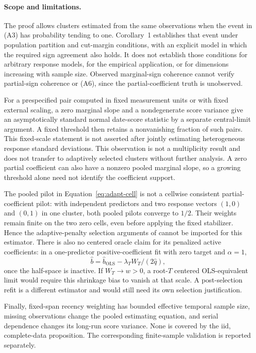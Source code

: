 \documentclass[11pt,a4paper]{article}
\begin{document}
\paragraph{Scope and limitations.}
The proof allows clusters estimated from the same observations when the event
in (A3) has probability tending to one. Corollary~1 establishes that event
under population partition and cut-margin conditions, with an explicit model
in which the required sign agreement also holds. It does not establish those
conditions for arbitrary response models, for the empirical application, or
for dimensions increasing with sample size. Observed marginal-sign coherence
cannot verify partial-sign coherence or (A6), since the partial-coefficient
truth is unobserved.

For a prespecified pair computed in fixed measurement units or with fixed
external scaling, a zero marginal slope and a nondegenerate score variance
give an asymptotically standard normal date-score statistic by a separate
central-limit argument. A fixed threshold then retains a nonvanishing
fraction of such pairs. This fixed-scale statement is not asserted after
jointly estimating heterogeneous response standard deviations.
This observation is not a multiplicity result and
does not transfer to adaptively selected clusters without further analysis.
A zero partial coefficient can also have a nonzero pooled marginal slope,
so a growing threshold alone need not identify the coefficient support.

The pooled pilot in Equation~\eqref{eq:adapt-cell} is not a cellwise consistent
partial-coefficient pilot: with independent predictors and two response
vectors $(1,0)$ and $(0,1)$ in one cluster, both pooled pilots converge to
$1/2$. Their weights remain finite on the two zero cells, even before applying
the fixed stabilizer. Hence the adaptive-penalty selection arguments of
\citet{Zou:2006,Wang+Leng:2008} cannot be imported for this estimator.
There is also no centered oracle claim for its penalized active coefficients:
in a one-predictor positive-coefficient fit with zero target and $\alpha=1$,
\[
 \widehat b=\widehat b_{\mathrm{OLS}}
       -\lambda_T W_T/(2\widehat q),
\]
once the half-space is inactive. If $W_T\to w>0$, a root-$T$ centered
OLS-equivalent limit would require this shrinkage bias to vanish at that
scale. A post-selection refit is a different estimator and would still need
its own selection justification.

Finally, fixed-span recency weighting has bounded effective temporal sample
size, missing observations change the pooled estimating equation, and serial
dependence changes its long-run score variance. None is covered by the iid,
complete-data proposition. The corresponding finite-sample validation is
reported separately.
\end{document}
